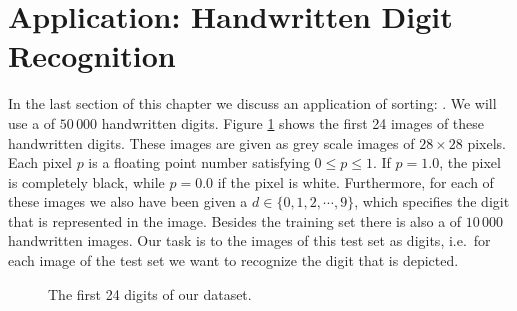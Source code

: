 \section{Application: Handwritten Digit Recognition}
In the last section of this chapter we discuss an application of sorting:
.
We will use a  of $50\,000$ handwritten digits. Figure \ref{fig:digits.pdf} shows the first 24
images of these handwritten digits.  These images are given as grey scale images of $28 \times 28$ pixels.
Each pixel $p$ is a floating point number satisfying $0 \leq p \leq 1$. If $p = 1.0$, the pixel is completely
black, while $p = 0.0$ if the pixel is white.  Furthermore, for each of these images we also have been given a
 $d \in \{0,1,2,\cdots,9\}$, which specifies the digit that is represented in the image.  Besides the training set 
there is also a  of $10\,000$ handwritten images.  Our task is to  the images
of this test set as digits, i.e.~for each image of the test set we want to recognize the digit that is depicted.


\begin{figure}[!ht]
  \centering
  \caption{The first 24 digits of our dataset.}
  \label{fig:digits.pdf}
\end{figure}

